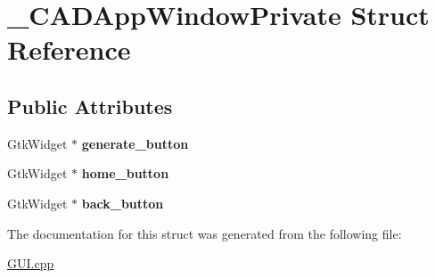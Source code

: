 \hypertarget{struct___c_a_d_app_window_private}{}\section{\+\_\+\+C\+A\+D\+App\+Window\+Private Struct Reference}
\label{struct___c_a_d_app_window_private}
\subsection*{Public Attributes}
\begin{DoxyCompactItemize}
\item 
\mbox{\label{struct___c_a_d_app_window_private_a065d3f6f1a97d11442ee299c0fa54bff}} 
Gtk\+Widget $\ast$ {\bfseries generate\+\_\+button}
\item 
\mbox{\label{struct___c_a_d_app_window_private_ac63d137c9592d3c070d211e21121bc7b}} 
Gtk\+Widget $\ast$ {\bfseries home\+\_\+button}
\item 
\mbox{\label{struct___c_a_d_app_window_private_a544a480d82f3b17f8e646ba461def56c}} 
Gtk\+Widget $\ast$ {\bfseries back\+\_\+button}
\end{DoxyCompactItemize}


The documentation for this struct was generated from the following file\+:\begin{DoxyCompactItemize}
\item 
\mbox{\hyperlink{_g_u_i_8cpp}{G\+U\+I.\+cpp}}\end{DoxyCompactItemize}

